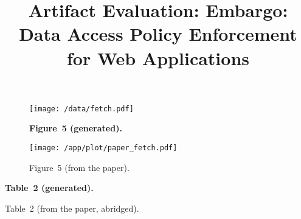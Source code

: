 \documentclass{article}
\title{Artifact Evaluation: Embargo: Data Access Policy Enforcement for Web Applications}
\author{}
\date{}
\begin{document}
\maketitle

\begin{figure}[H]\centering
    \texttt{[image: /data/fetch.pdf]}
    \caption*{\bf Figure~5 (generated).}
\end{figure}

\begin{figure}[H]\centering
    \texttt{[image: /app/plot/paper\_fetch.pdf]}
    \caption*{Figure~5 (from the paper).}
\end{figure}

\begin{table}[H]
\caption*{\bf Table~2 (generated).}
\small\centering

\end{table}

\begin{table}[H]
\caption*{Table~2 (from the paper, abridged).}
\small\centering

\end{table}
\end{document}
